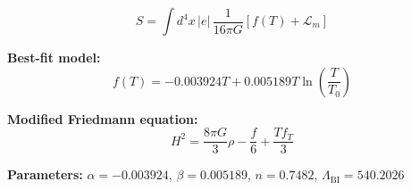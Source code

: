 
\begin{equation}
  S = \int d^4x \, |e| \, \frac{1}{16\pi G} \left[ f(T) + \mathcal{L}_m \right]
\end{equation}

\textbf{Best-fit model:}
\begin{equation}
  f(T) = -0.003924 T + 0.005189 T \ln\!\left(\frac{T}{T_0}\right)
\end{equation}

\textbf{Modified Friedmann equation:}
\begin{equation}
  H^2 = \frac{8\pi G}{3} \rho - \frac{f}{6} + \frac{T f_T}{3}
\end{equation}

\textbf{Parameters:}
$\alpha = -0.003924$, \quad
$\beta = 0.005189$, \quad
$n = 0.7482$, \quad
$\Lambda_{\text{BI}} = 540.2026$